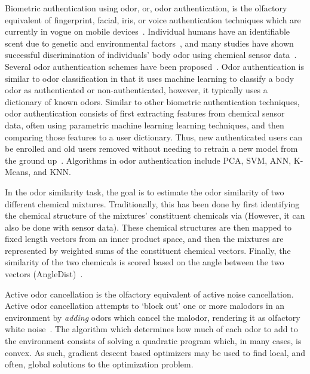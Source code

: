 Biometric authentication using odor, or, odor authentication, is the olfactory
equivalent of fingerprint, facial, iris, or voice authentication techniques
which are currently in vogue on mobile devices~\cite{stokkenes2016biometric}.
Individual humans have an identifiable scent due to genetic and environmental
factors~\cite{penn2007individual}, and many studies have shown successful
discrimination of individuals' body odor using chemical sensor
data~\cite{wongchoosuk2009detection, jha2015quick, jha2016gc}. Several odor
authentication schemes have been proposed~\cite{yang2018human,
shu2014identification}. Odor authentication is similar to odor classification
in that it uses machine learning to classify a body odor as authenticated or
non-authenticated, however, it typically uses a dictionary of known odors.
Similar to other biometric authentication techniques, odor authentication
consists of first extracting features from chemical sensor data, often using
parametric machine learning learning techniques, and then comparing those
features to a user dictionary. Thus, new authenticated users can be enrolled
and old users removed without needing to retrain a new model from the ground
up~\cite{wong2001enhanced}. Algorithms in odor authentication include PCA, SVM,
ANN, K-Means, and KNN.

In the odor similarity task, the goal is to estimate the odor similarity of two
different chemical mixtures.  Traditionally, this has been done by first
identifying the chemical structure of the mixtures' constituent chemicals via
\gcms{}
(However, it can also be done with sensor data).  These
chemical structures are then mapped to fixed length vectors from an inner
product space, and then the mixtures are represented by weighted sums of the
constituent chemical vectors.  Finally, the similarity of the two chemicals is
scored based on the angle between the two vectors
(AngleDist)~\cite{snitz2013predicting}. %

Active odor cancellation is the olfactory equivalent of active noise
cancellation.  Active odor cancellation attempts to `block out' one or more
malodors in an environment by \textit{adding} odors which cancel the malodor,
rendering it as olfactory white noise~\cite{varshney2014active}.
The algorithm which determines how much of each odor to add to the environment
consists of solving a quadratic program which, in many cases, is convex. As
such, gradient descent based optimizers may be used to find local, and often,
global solutions to the optimization problem.

